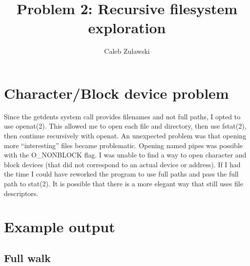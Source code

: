\documentclass{article}
\begin{document}
\title{Problem 2: Recursive filesystem exploration}
\author{Caleb Zulawski}

\maketitle

\section{Character/Block device problem}
Since the getdents system call provides filenames and not full paths, I opted to use openat(2).
This allowed me to open each file and directory, then use fstat(2), then continue recursively with openat.
An unexpected problem was that opening more ``interesting'' files became problematic.
Opening named pipes was possible with the O\_NONBLOCK flag.
I was unable to find a way to open character and block devices (that did not correspond to an actual device or address).
If I had the time I could have reworked the program to use full paths and pass the full path to stat(2).
It is possible that there is a more elegant way that still uses file descriptors.

\section{Example output}

\subsection{Full walk}
\end{document}
